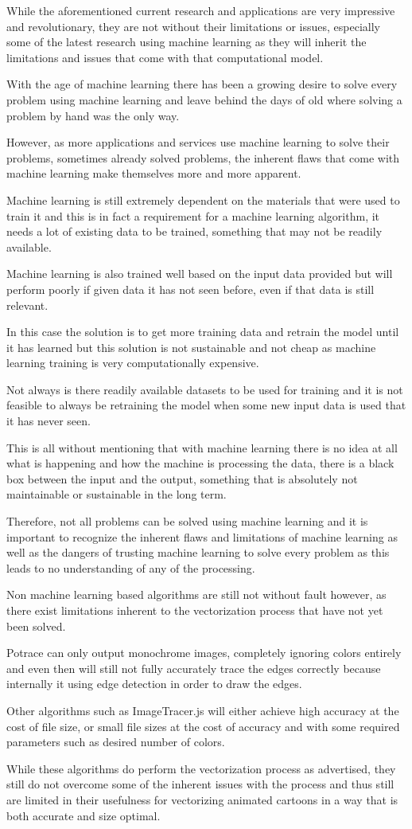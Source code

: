 \documentclass[12pt]{article}
\newcommand{\sentence}{} %
\begin{document}
    \tab
    While the aforementioned current research and applications are very impressive and revolutionary, they are not
    without their limitations or issues, especially some of the latest research using machine learning as they will
    inherit the limitations and issues that come with that computational model.
    \sentence
    With the age of machine learning there has been a growing desire to solve every problem using machine learning
    and leave behind the days of old where solving a problem by hand was the only way.
    \sentence
    However, as more applications and services use machine learning to solve their problems, sometimes already solved
    problems, the inherent flaws that come with machine learning make themselves more and more apparent.
    \sentence
    Machine learning is still extremely dependent on the materials that were used to train it and this is in fact a
    requirement for a machine learning algorithm, it needs a lot of existing data to be trained, something that may
    not be readily available.
    \sentence
    Machine learning is also trained well based on the input data provided but will perform poorly if given data it
    has not seen before, even if that data is still relevant.
    \sentence
    In this case the solution is to get more training data and retrain the model until it has learned but this
    solution is not sustainable and not cheap as machine learning training is very computationally expensive.
    \sentence
    Not always is there readily available datasets to be used for training and it is not feasible to always be
    retraining the model when some new input data is used that it has never seen.
    \sentence
    This is all without mentioning that with machine learning there is no idea at all what is happening and how the
    machine is processing the data, there is a black box between the input and the output, something that is
    absolutely not maintainable or sustainable in the long term.
    \sentence
    Therefore, not all problems can be solved using machine learning and it is important to recognize the inherent
    flaws and limitations of machine learning as well as the dangers of trusting machine learning to solve every
    problem as this leads to no understanding of any of the processing.

    \bigskip
    Non machine learning based algorithms are still not without fault however, as there exist limitations
    inherent to the vectorization process that have not yet been solved.
    \sentence
    Potrace can only output monochrome images, completely ignoring colors entirely and even then will still not fully
    accurately trace the edges correctly because internally it using edge detection in order to draw the edges.
    \sentence
    Other algorithms such as ImageTracer.js will either achieve high accuracy at the cost of file size, or small file
    sizes at the cost of accuracy and with some required parameters such as desired number of colors.
    \sentence
    While these algorithms do perform the vectorization process as advertised, they still do not overcome some of the
    inherent issues with the process and thus still are limited in their usefulness for vectorizing animated cartoons
    in a way that is both accurate and size optimal.
\end{document}
